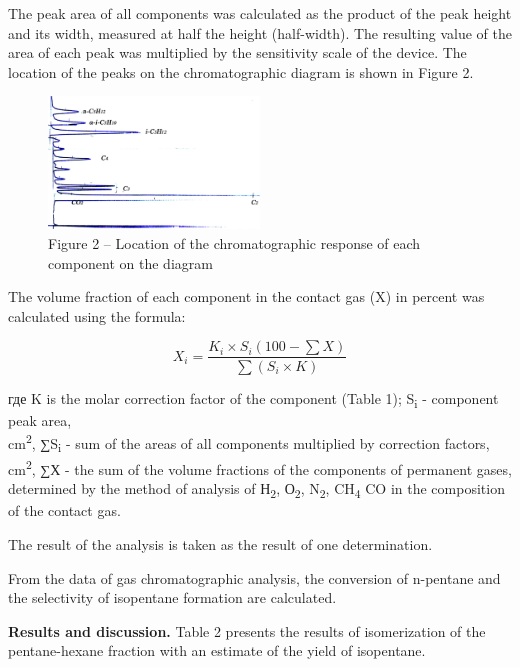 \begin{multicols}{2}
The peak area of all components was calculated as the product of the
peak height and its width, measured at half the height (half-width). The
resulting value of the area of each peak was multiplied by the
sensitivity scale of the device. The location of the peaks on the
chromatographic diagram is shown in Figure 2.
\end{multicols}

\begin{figure}[H]
	\centering
	\includegraphics[width=0.5\textwidth]{assets/1054}
	\caption*{Figure 2 -- Location of the chromatographic response of each component on the diagram}
\end{figure}

\begin{multicols}{2}
The volume fraction of each component in the contact gas (X) in percent
was calculated using the formula:

\[X_{i} = \frac{K_{i} \times S_{i} \left( 100 - \sum X \right)}{\sum (S_{i} \times K)} \]

где K is the molar correction factor of the component (Table 1);
S\textsubscript{i} - component peak area,\\
cm\textsuperscript{2}, ∑S\textsubscript{i} - sum of the areas of all
components multiplied by correction factors, cm\textsuperscript{2}, ∑Х -
the sum of the volume fractions of the components of permanent gases,
determined by the method of analysis of Н\textsubscript{2},
О\textsubscript{2}, N\textsubscript{2}, CH\textsubscript{4} CO in the
composition of the contact gas.

The result of the analysis is taken as the result of one determination.

From the data of gas chromatographic analysis, the conversion of
n-pentane and the selectivity of isopentane formation are calculated.

{\bfseries Results and discussion.} Table 2 presents the results of
isomerization of the pentane-hexane fraction with an estimate of the
yield of isopentane.
\end{multicols}

